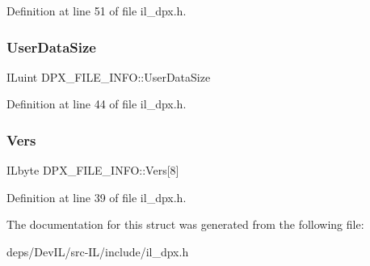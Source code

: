 Definition at line 51 of file il\+\_\+dpx.\+h.

\mbox{\label{structDPX__FILE__INFO_ad92267e383106baaba9397fb1effe1e2}} 
\subsubsection{\texorpdfstring{User\+Data\+Size}{UserDataSize}}
{\footnotesize\ttfamily I\+Luint D\+P\+X\+\_\+\+F\+I\+L\+E\+\_\+\+I\+N\+F\+O\+::\+User\+Data\+Size}



Definition at line 44 of file il\+\_\+dpx.\+h.

\mbox{\label{structDPX__FILE__INFO_a77faed3fb4dd0bcf0db4e813142cdcc0}} 
\subsubsection{\texorpdfstring{Vers}{Vers}}
{\footnotesize\ttfamily I\+Lbyte D\+P\+X\+\_\+\+F\+I\+L\+E\+\_\+\+I\+N\+F\+O\+::\+Vers\mbox{[}8\mbox{]}}



Definition at line 39 of file il\+\_\+dpx.\+h.



The documentation for this struct was generated from the following file\+:\begin{DoxyCompactItemize}
\item 
deps/\+Dev\+I\+L/src-\/\+I\+L/include/il\+\_\+dpx.\+h\end{DoxyCompactItemize}
